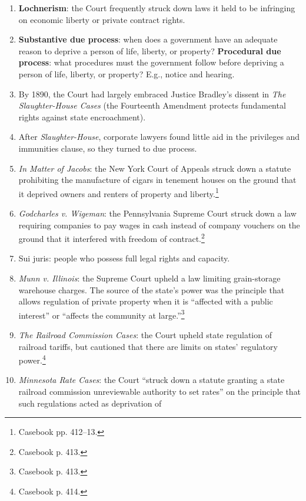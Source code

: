 \begin{enumerate}
    \item \textbf{Lochnerism}: the Court frequently struck down laws it held to be 
    infringing on economic liberty or private contract rights.
    \item \textbf{Substantive due process}: when does a government have an 
    adequate reason to deprive a person of life, liberty, or property?
    \textbf{Procedural due process}: what procedures must the government 
    follow before depriving a person of life, liberty, or property? E.g., 
    notice and hearing.
    \item By 1890, the Court had largely embraced Justice Bradley's dissent in 
    \emph{The Slaughter-House Cases} (the Fourteenth Amendment protects 
    fundamental rights against state encroachment).
    \item After \emph{Slaughter-House}, corporate lawyers found little aid in 
    the privileges and immunities clause, so they turned to due process.
    \item \emph{In Matter of Jacobs}: the New York Court of Appeals struck down a 
    statute prohibiting the manufacture of cigars in tenement houses on the 
    ground that it deprived owners and renters of property and 
    liberty.\footnote{Casebook pp. 412--13.}
    \item \emph{Godcharles v. Wigeman}: the Pennsylvania Supreme Court struck 
    down a law requiring companies to pay wages in cash instead of company 
    vouchers on the ground that it interfered with freedom of 
    contract.\footnote{Casebook p. 413.}
    \item Sui juris: people who possess full legal rights and capacity.
    \item \emph{Munn v. Illinois}: the Supreme Court upheld a law limiting 
    grain-storage warehouse charges. The source of the state's power was the 
    principle that allows regulation of private property when it is ``affected 
    with a public interest'' or ``affects the community at 
    large.''\footnote{Casebook p. 413.}
    \item \emph{The Railroad Commission Cases}: the Court upheld state 
    regulation of railroad tariffs, but cautioned that there are limits on 
    states' regulatory power.\footnote{Casebook p. 414.}
    \item \emph{Minnesota Rate Cases}: the Court ``struck down a statute 
    granting a state railroad commission unreviewable authority to set 
    rates'' on the principle that such regulations acted as deprivation of 

\end{enumerate}
